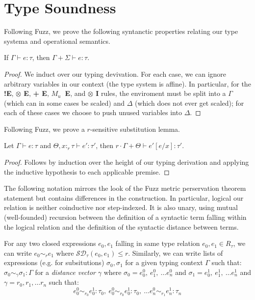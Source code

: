 \section{Type Soundness}
Following Fuzz, we prove the following syntanctic properties relating our type
systema and operational semantics.

\begin{lemma}[Weakening]\label{thm:weakening}
  If $\Gamma \vdash e : \tau$, then $\Gamma + \Sigma \vdash e : \tau$.
\end{lemma}
\begin{proof}
  We induct over our typing devivation. 
  For each case, we can ignore arbitrary variables in our context (the type system is
  affine). 
  In particular, for the \textbf{!E}, \textbf{$\otimes$ E}, \textbf{+ E},
  \textbf{$M_u$~E}, and \textbf{$\otimes$ I} rules, the enviroment must be split
  into a $\Gamma$ (which can in some cases be scaled) and $\Delta$ (which does
  not ever get scaled); for each of these cases we choose to push unused
  variables into $\Delta$. 
\end{proof}

Following Fuzz, we prove a $r$-sensitive substitution lemma.
\begin{lemma}\label{thm:substitution}
  Let $\Gamma \vdash e : \tau$ and $\Theta, x :_r \tau \vdash e' : \tau'$, then 
  $r \cdot \Gamma + \Theta \vdash e'[e/x] : \tau'$.
\end{lemma}
\begin{proof}
  Follows by induction over the height of our typing derivation and applying the
  inductive hypothesis to each applicable premise.
\end{proof}

The following notation mirrors the look of the Fuzz metric perservation theorem
statement but contains differences in the construction. In particular, logical our
relation is neither coinductive nor step-indexed. It is also unary, using mutual
(well-founded) recursion between the definition of a syntactic term falling
within the logical relation and the definition of the syntactic distance between
terms.

For any two closed expressions $e_0, e_1$ falling in same type relation $e_0,
e_1 \in R_\tau$, we can write $e_0 \sim_r e_1$ where $\mathcal{SD}_{\tau}(e_0,
e_1) \leq r$. Similarly, we can write lists of expressions (e.g. for
subsitutions) $\sigma_0, \sigma_1$ for a given typing context $\Gamma$ such
that: $\sigma_0 \sim_{\gamma} \sigma_1 : \Gamma$ for a \textit{distance vector}
$\gamma$
where
$\sigma_0 = e^0_0,~e^0_1,~\ldots e^0_n$ 
and $\sigma_1 = e^1_0,~e^1_1,~\ldots e^1_n$ 
and $\gamma = r_0, r_1, \ldots r_n$ such that:
$$e^0_0 \sim_{r_0} e^1_0 :
\tau_0,~e^0_0 \sim_{r_0} e^1_0 : \tau_0,~\ldots e^0_n \sim_{r_1} e^1_n :
\tau_n$$

